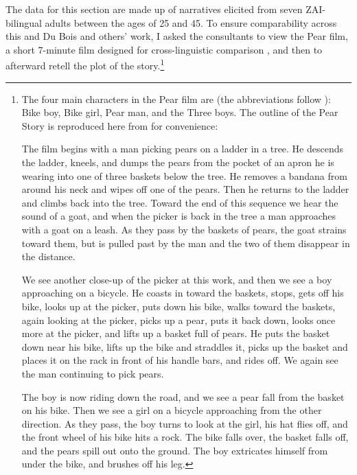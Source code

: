 The data for this section are made up of narratives elicited from seven ZAI- bilingual adults between the ages of 25 and 45. To ensure comparability across this and Du Bois and others' work, I asked the consultants to view the Pear film, a short 7-minute film designed for cross-linguistic comparison \citep{chafe1980}, and then to afterward retell the plot of the story.\footnote{The four main characters in the Pear film are (the abbreviations follow \citealt{chafe1980}): Bike boy, Bike girl, Pear man, and the Three boys. The outline of the Pear Story is reproduced here from \citet[xiii-xiv]{chafe1980} for convenience:

The film begins with a man picking pears on a ladder in a tree. He descends the ladder, kneels, and dumps the pears from the pocket of an apron he is wearing into one of three baskets below the tree. He removes a bandana from around his neck and wipes off one of the pears. Then he returns to the ladder and climbs back into the tree. Toward the end of this sequence we hear the sound of a goat, and when the picker is back in the tree a man approaches with a goat on a leash. As they pass by the baskets of pears, the goat strains toward them, but is pulled past by the man and the two of them disappear in the distance. 

We see another close-up of the picker at this work, and then we see a boy approaching on a bicycle. He coasts in toward the baskets, stops, gets off his bike, looks up at the picker, puts down his bike, walks toward the baskets, again looking at the picker, picks up a pear, puts it back down, looks once more at the picker, and lifts up a basket full of pears. He puts the basket down near his bike, lifts up the bike and straddles it, picks up the basket and places it on the rack in front of his handle bars, and rides off. We again see the man continuing to pick pears.

The boy is now riding down the road, and we see a pear fall from the basket on his bike. Then we see a girl on a bicycle approaching from the other direction. As they pass, the boy turns to look at the girl, his hat flies off, and the front wheel of his bike hits a rock. The bike falls over, the basket falls off, and the pears spill out onto the ground. The boy extricates himself from under the bike, and brushes off his leg. 

}

